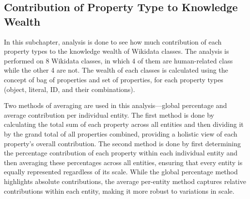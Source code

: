 \subsection{Contribution of Property Type to Knowledge Wealth} \label{wealth & proptype contribution}

In this subchapter, analysis is done to see how much contribution of each property types to the knowledge wealth of Wikidata classes. The analysis is performed on 8 Wikidata classes, in which 4 of them are human-related class while the other 4 are not. The wealth of each classes is calculated using the concept of bag of properties and set of properties, for each property types (object, literal, ID, and their combinations).

Two methods of averaging are used in this analysis—global percentage and average contribution per individual entity. The first method is done by calculating the total sum of each property across all entities and then dividing it by the grand total of all properties combined, providing a holistic view of each property's overall contribution. The second method is done by first determining the percentage contribution of each property within each individual entity and then averaging these percentages across all entities, ensuring that every entity is equally represented regardless of its scale. While the global percentage method highlights absolute contributions, the average per-entity method captures relative contributions within each entity, making it more robust to variations in scale.

